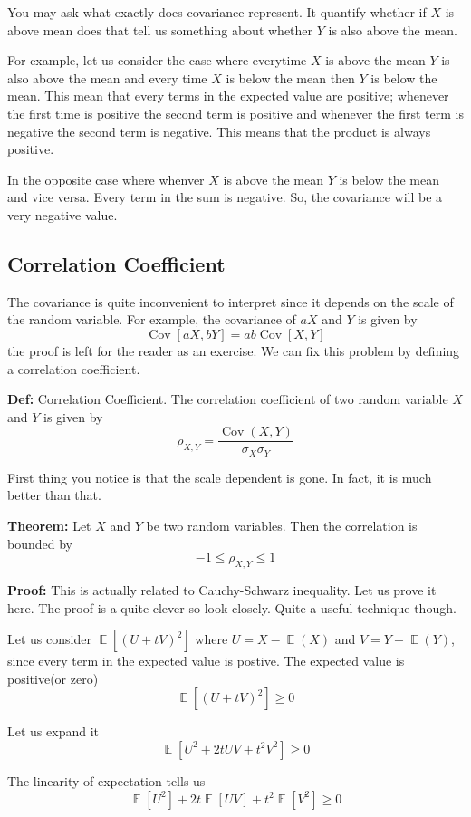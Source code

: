 \documentclass[a4paper, 12pt]{article}
\newcommand{\definition}{\vspace{1em}\noindent\textbf{Def:} }
\newcommand{\theorem}{\vspace{1em}\noindent\textbf{Theorem:} }
\renewcommand{\proof}{\vspace{0.5em}\noindent\textbf{Proof:} }
\DeclareMathOperator{\E}{\mathbb{E}}
\DeclareMathOperator{\Cov}{Cov}
\begin{document}
\begin{multicols}{2}
You may ask what exactly does covariance represent. It quantify whether if $X$ is above mean does that tell us something about whether $Y$ is also above the mean.

For example, let us consider the case where everytime $X$ is above the mean $Y$ is also above the mean and every time $X$ is below the mean then $Y$ is below the mean. This mean that every terms in the expected value are positive; whenever the first time is positive the second term is positive and whenever the first term is negative the second term is negative. This means that the product is always positive.

In the opposite case where whenver $X$ is above the mean $Y$ is below the mean and vice versa. Every term in the sum is negative. So, the covariance will be a very negative value.

\subsection*{Correlation Coefficient}

The covariance is quite inconvenient to interpret since it depends on the scale of the random variable. For example, the covariance of $aX$ and $Y$ is given by
\[
	\Cov[aX,bY] = ab \Cov[X,Y]
\]
the proof is left for the reader as an exercise. We can fix this problem by defining a correlation coefficient.

\definition Correlation Coefficient. The correlation coefficient of two random variable $X$ and $Y$ is given by
\[
	\rho_{X,Y} = \frac{\Cov(X,Y)}{\sigma_X \sigma_Y}
\]

First thing you notice is that the scale dependent is gone. In fact, it is much better than that.

\theorem Let $X$ and $Y$ be two random variables. Then the correlation is bounded by
\[
	-1 \le \rho_{X,Y} \le 1
\]

\proof This is actually related to Cauchy-Schwarz inequality. Let us prove it here. The proof is a quite clever so look closely. Quite a useful technique though.

Let us consider $\E[(U + tV)^2]$ where $U = X-\E(X)$ and $V=Y-\E(Y)$, since every term in the expected value is postive. The expected value is positive(or zero)
\[
	\E[(U + tV)^2] \ge 0
\]

Let us expand it
\[
	\E[U^2 + 2t UV + t^2V^2] \ge 0
\]

The linearity of expectation tells us
\[
	\E[U^2] + 2 t \E[UV] + t^2\E[V^2] \ge 0
\]


\end{multicols}
\end{document}
